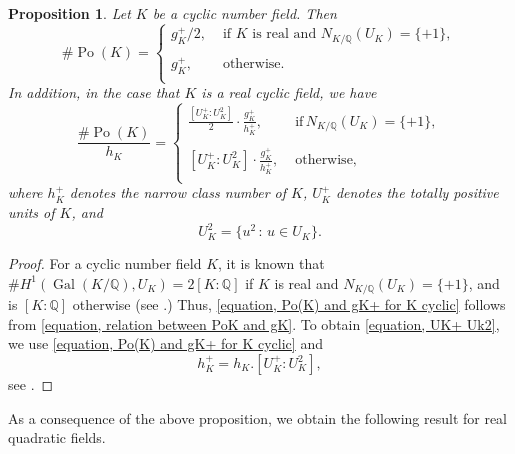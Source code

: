 \documentclass[12pt]{amsart}
\newtheorem{proposition}[theorem]{Proposition}
\theoremstyle{definition}
\numberwithin{equation}{section}
\DeclareMathOperator{\Po}{Po}
\DeclareMathOperator{\Gal}{Gal}
\begin{document}
\begin{proposition} \label{proposition, Po(K) and gK for K cyclic}
	Let $K$ be a cyclic number field. Then
		\begin{equation} \label{equation, Po(K) and gK+ for K cyclic}
		\# \Po(K) = \left\{
		\begin{array}{ll}
			g_K^+/2, \,  & \,  \text{if $K$ is real and $N_{K/\mathbb{Q}}(U_K)=\{+1\}$},\\
			& \\
			g_K^+, \, & \, \text{otherwise.} \\	
		\end{array}
		\right.	
	\end{equation}
In addition, in the case that $K$ is a real cyclic field, we have
\begin{equation} \label{equation, UK+ Uk2}
	 \frac{\# \Po(K)}{h_K} = \left\{
	\begin{array}{ll}
		\frac{[U_K^+: U_K^2]}{2}\cdot \frac{g_K^+}{h_K^+}, \,  & \, \text{if} \, N_{K/\mathbb{Q}}(U_K)=\{+1\}, \\
		& \\
		{[U_K^+: U_K^2]}\cdot \frac{g_K^+}{h_K^+}, \, & \, \text{otherwise,} \\	
	\end{array}
	\right.	
		\end{equation}
	where $h_K^+$ denotes the narrow class number of $K$, $U_K^+$ denotes the totally positive units of $K$, and
	\begin{equation*}
		U_K^2=\{u^2 \, : \, u \in U_K\}.
	\end{equation*}	
\end{proposition}
\begin{proof}
For a cyclic number field $K$, it is known that 
$\#H^1(\Gal(K/\mathbb{Q}),U_K)=2[K:\mathbb{Q}]$ if $K$ is real and $N_{K/\mathbb{Q}}(U_K)=\{+1\}$, and is $[K:\mathbb{Q}]$ otherwise (see \cite[Section 3]{Zantema}.) Thus, \eqref{equation, Po(K) and gK+ for K cyclic} follows from \eqref{equation, relation between PoK and gK}. To obtain \eqref{equation, UK+ Uk2}, we use  \eqref{equation, Po(K) and gK+ for K cyclic} and 
\begin{equation*}
	h_K^+=h_K.\left[U_K^+:U_K^2\right],
\end{equation*}
see \cite[Theorem 1.7]{milneCFT}.     
\end{proof}
As a consequence of the above proposition, we obtain the following result for real quadratic fields. 
\end{document}
